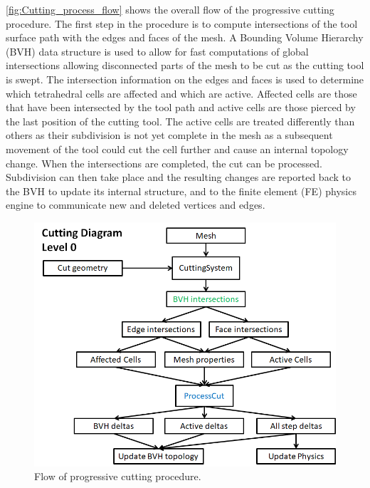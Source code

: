 
\autoref{fig:Cutting_process_flow} shows the overall flow of the progressive cutting procedure. The first step in the procedure is to compute intersections of the tool surface path with the edges and faces of the mesh. A Bounding Volume Hierarchy (BVH) data structure is used to allow for fast computations of global intersections allowing disconnected parts of the mesh to be cut as the cutting tool is swept. The intersection information on the edges and faces is used to determine which tetrahedral cells are affected and which are active. Affected cells are those that have been intersected by the tool path and active cells are those pierced by the last position of the cutting tool. The active cells are treated differently than others as their subdivision is not yet complete in the mesh as a subsequent movement of the tool could cut the cell further and cause an internal topology change.  When the intersections are completed, the cut can be processed. Subdivision can then take place and the resulting changes are reported back to the BVH to update its internal structure, and to the finite element (FE) physics engine to communicate new and deleted vertices and edges.  

\begin{figure}
  \centering%
  \includegraphics[width=0.75\linewidth]{figures/cutting/Process_cut.png}
  \caption{Flow of progressive cutting procedure.}\label{fig:Cutting_process_flow}
\end{figure}



